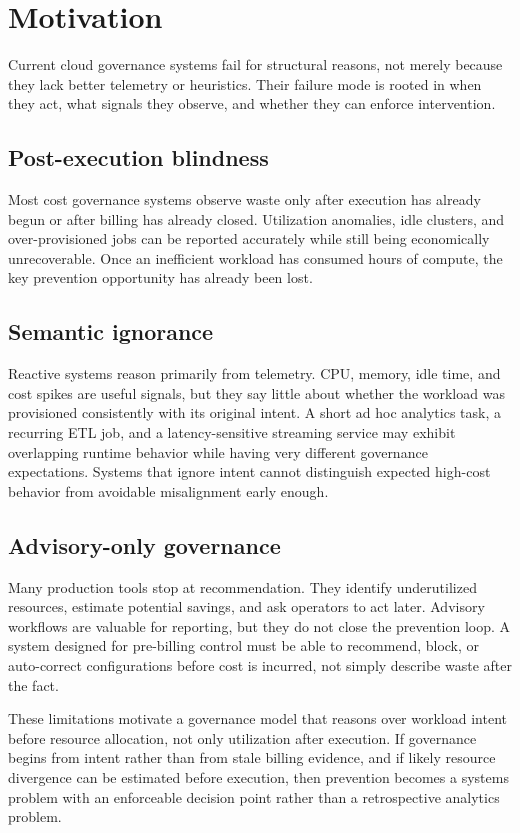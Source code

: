 \section{Motivation}

Current cloud governance systems fail for structural reasons, not merely because
they lack better telemetry or heuristics. Their failure mode is rooted in when
they act, what signals they observe, and whether they can enforce intervention.

\subsection{Post-execution blindness}

Most cost governance systems observe waste only after execution has already begun or after billing has already closed. Utilization anomalies, idle clusters, and over-provisioned jobs can be reported accurately while still being economically unrecoverable. Once an inefficient workload has consumed hours of compute, the key prevention opportunity has already been lost.

\subsection{Semantic ignorance}

Reactive systems reason primarily from telemetry. CPU, memory, idle time, and cost spikes are useful signals, but they say little about whether the workload was provisioned consistently with its original intent. A short ad hoc analytics task, a recurring ETL job, and a latency-sensitive streaming service may exhibit overlapping runtime behavior while having very different governance expectations. Systems that ignore intent cannot distinguish expected high-cost behavior from avoidable misalignment early enough.

\subsection{Advisory-only governance}

Many production tools stop at recommendation. They identify underutilized resources, estimate potential savings, and ask operators to act later. Advisory workflows are valuable for reporting, but they do not close the prevention loop. A system designed for pre-billing control must be able to recommend, block, or auto-correct configurations before cost is incurred, not simply describe waste after the fact.

These limitations motivate a governance model that reasons over workload intent
before resource allocation, not only utilization after execution. If governance
begins from intent rather than from stale billing evidence, and if likely
resource divergence can be estimated before execution, then prevention becomes a
systems problem with an enforceable decision point rather than a retrospective
analytics problem.
